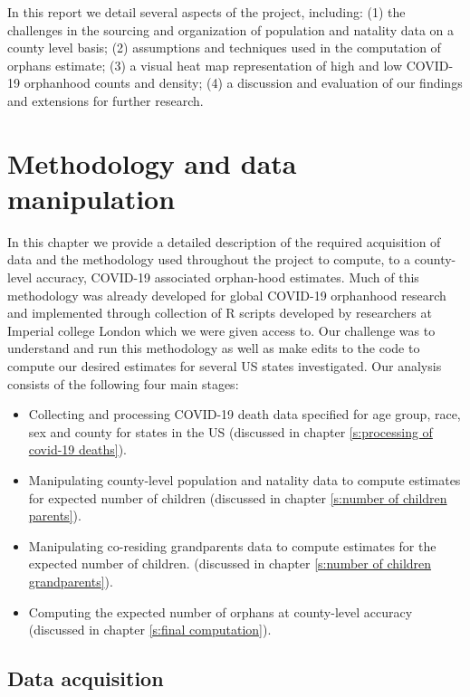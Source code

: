 \documentclass[11pt]{article}
\begin{document}
In this report we detail several aspects of the project, including: (1) the challenges in the sourcing and organization of population and natality data on a county level basis; (2) assumptions and techniques used in the computation of orphans estimate; (3) a visual heat map representation of high and low COVID-19 orphanhood counts and density; (4) a discussion and evaluation of our findings and extensions for further research. 

\section{Methodology and data manipulation}
In this chapter we provide a detailed description of the required acquisition of data and the methodology used throughout the project to compute, to a county-level accuracy, COVID-19 associated orphan-hood estimates. Much of this methodology was already developed for global COVID-19 orphanhood research and implemented through collection of R scripts developed by researchers at Imperial college London\cite{global_study} which we were given access to. Our challenge was to understand and run this methodology as well as make edits to the code to compute our desired estimates for several US states investigated. Our analysis consists of the following four main stages: 

\begin{itemize}
    \item Collecting and processing COVID-19 death data specified for age group, race, sex and county for states in the US (discussed in chapter \ref{s:processing of covid-19 deaths}).
    \item Manipulating county-level population and natality data to compute estimates for expected number of children (discussed in chapter \ref{s:number of children parents}).
    \item Manipulating co-residing grandparents data to compute estimates for the expected number of children. (discussed in chapter \ref{s:number of children grandparents}).
    \item Computing the expected number of orphans at county-level accuracy (discussed in chapter \ref{s:final computation}).
\end{itemize}



\subsection{Data acquisition}\label{s:data_acquisition}
\end{document}
